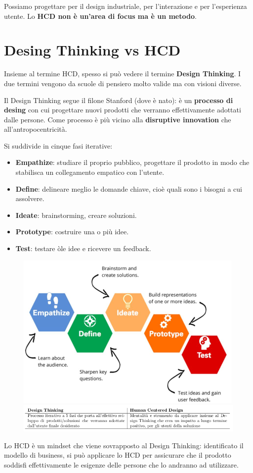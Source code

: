 \documentclass[a4paper,11pt,oneside]{book}
\begin{document}
Possiamo progettare per il design industriale, per l'interazione e per l'esperienza utente. Lo \textbf{HCD non è un'area di focus ma è un metodo}.

\section{Desing Thinking vs HCD}
Insieme al termine HCD, spesso si può vedere il termine \textbf{Design Thinking}. I due termini vengono da scuole di pensiero molto valide ma con visioni diverse.

Il Design Thinking segue il filone Stanford (dove è nato): è un \textbf{processo di desing} con cui progettare nuovi prodotti che verranno effettivamente adottati dalle persone. Come processo è più vicino alla \textbf{disruptive innovation} che all'antropocentricità.

Si suddivide in cinque fasi iterative:

\begin{itemize}
	\item \textbf{Empathize}: studiare il proprio pubblico, progettare il prodotto in modo che stabilisca un collegamento empatico con l'utente.
	\item \textbf{Define}: delineare meglio le domande chiave, cioè quali sono i bisogni a cui assolvere.
	\item \textbf{Ideate}: brainstorming, creare soluzioni.
	\item \textbf{Prototype}: costruire una o più idee.
	\item \textbf{Test}: testare òle idee e ricevere un feedback.
\end{itemize}

\begin{figure}
	\centering
	\includegraphics[scale=0.5]{"immagini/Fasi Design Thinking"}
	\includegraphics[scale=0.4]{"immagini/Design Thinking vs HCD"}
\end{figure}
Lo HCD è un mindset che viene sovrapposto al Design Thinking: identificato il modello di business, si può applicare lo HCD per assicurare che il prodotto soddisfi effettivamente le esigenze delle persone che lo andranno ad utilizzare.
\end{document}
